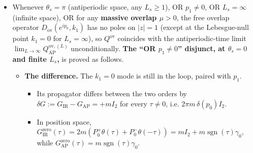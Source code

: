 \documentclass[11pt,a4paper]{article}
\begin{document}
\begin{itemize}
\item{} Whenever {\bfseries\boldmath $\theta_s = \pi$} (antiperiodic space, any $L_s \ge 1$), OR {\bfseries\boldmath $p_1 \ne 0$}, OR {\bfseries\boldmath $L_s = \infty$} (infinite space), OR for any {\bfseries\boldmath massive overlap $\mu > 0$}, the free overlap operator $D_{\text{ov}}(e^{i p_0}, k_1)$ has no poles on $|z| = 1$ (except at the Lebesgue-null point $k_1 = 0$ for $L_s = \infty$), so $Q^{\text{ov}}$ coincides with the antiperiodic-time limit $\lim_{L \to \infty} Q^{\text{ov},(L)}_{\text{AP}}$ unconditionally.
{\bfseries\boldmath The ``OR $p_1 \ne 0$'' disjunct, at $\theta_s = 0$ and finite $L_s$,} is proved as follows.
\begin{itemize}
\item{} {\bfseries\boldmath The difference.} The $k_1 = 0$ mode is still in the loop, paired with $p_1$.
\begin{itemize}
\item{} Its propagator differs between the two orders by $\delta G := G_{\text{IR}} - G_{\text{AP}} = +m I_2$ for every $\tau \ne 0$, i.e. $2\pi m\, \delta(p_0) I_2$.
\item{} In position space, $G_{\text{IR}}^{\text{zero}}(\tau) = 2m(P_0^+ \theta(\tau) + P_0^- \theta(-\tau)) = m I_2 + m \operatorname{sgn}(\tau) \gamma_0$, while $G_{\text{AP}}^{\text{zero}}(\tau) = m \operatorname{sgn}(\tau) \gamma_0$.
\end{itemize}


\end{itemize}
\end{itemize}
\end{document}
